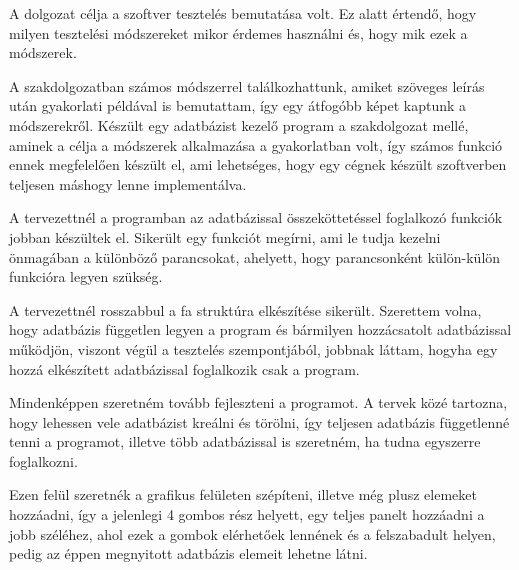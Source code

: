 


A dolgozat célja a szoftver tesztelés bemutatása volt. Ez alatt értendő, hogy milyen tesztelési módszereket mikor érdemes használni és, hogy mik ezek a módszerek.

A szakdolgozatban számos módszerrel találkozhattunk, amiket szöveges leírás után gyakorlati példával is bemutattam, így egy átfogóbb képet kaptunk a módszerekről.
Készült egy adatbázist kezelő program a szakdolgozat mellé, aminek a célja a módszerek alkalmazása a gyakorlatban volt, így számos funkció ennek megfelelően készült el, ami lehetséges, hogy egy cégnek készült szoftverben teljesen máshogy lenne implementálva.

A tervezettnél a programban az adatbázissal összeköttetéssel foglalkozó funkciók jobban készültek el. Sikerült egy funkciót megírni, ami le tudja kezelni önmagában a különböző parancsokat, ahelyett, hogy parancsonként külön-külön funkcióra legyen szükség.

A tervezettnél rosszabbul a fa struktúra elkészítése sikerült. Szerettem volna, hogy adatbázis független legyen a program és bármilyen hozzácsatolt adatbázissal működjön, viszont végül a tesztelés szempontjából, jobbnak láttam, hogyha egy hozzá elkészített adatbázissal foglalkozik csak a program.


Mindenképpen szeretném tovább fejleszteni a programot. A tervek közé tartozna, hogy lehessen vele adatbázist kreálni és törölni, így teljesen adatbázis függetlenné tenni a programot, illetve több adatbázissal is szeretném, ha tudna egyszerre foglalkozni.

Ezen felül szeretnék a grafikus felületen szépíteni, illetve még plusz elemeket hozzáadni, így a jelenlegi 4 gombos rész helyett, egy teljes panelt hozzáadni a jobb széléhez, ahol ezek a gombok elérhetőek lennének és a felszabadult helyen, pedig az éppen megnyitott adatbázis elemeit lehetne látni.
